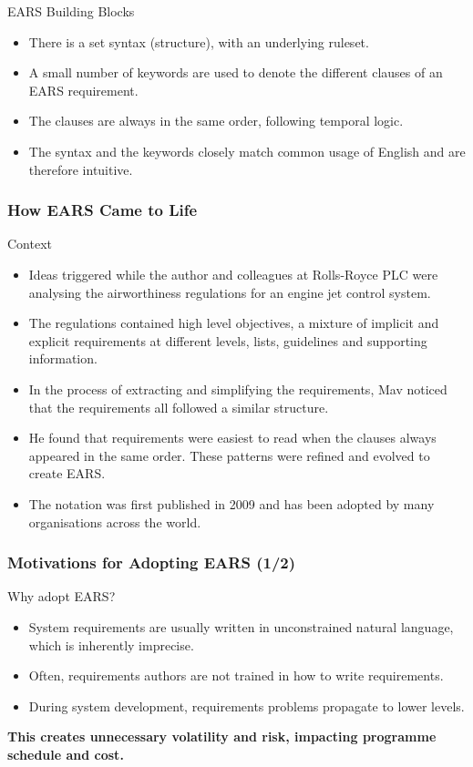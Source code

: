 \documentclass[aspectratio=169]{beamer}
\begin{document}
\begin{frame}

\begin{block}{EARS Building Blocks}
  \begin{itemize}
    \item There is a set syntax (structure), with an underlying ruleset. 
    \item A small number of keywords are used to denote the different clauses of an EARS requirement. 
    \item The clauses are always in the same order, following temporal logic. 
    \item The syntax and the keywords closely match common usage of English and are therefore intuitive.
  \end{itemize}  
\end{block}

\end{frame}


\begin{frame}
  \small
  \frametitle{How EARS Came to Life}
  \begin{block}{Context}
  \begin{itemize}
    \item Ideas triggered while the author and colleagues at Rolls-Royce PLC were analysing the airworthiness regulations for an engine jet control system. 
    \item The regulations contained high level objectives, a mixture of implicit and explicit requirements at different levels, lists, guidelines and supporting information.
    \item In the process of extracting and simplifying the requirements, Mav noticed that the requirements all followed a similar structure.
    \item He found that requirements were easiest to read when the clauses always appeared in the same order. These patterns were refined and evolved to create EARS.
    \item The notation was first published in 2009 and has been adopted by many organisations across the world.
  \end{itemize}
  \end{block}
  
\end{frame}

\begin{frame}
  \frametitle{Motivations for Adopting EARS (1/2)}
  \begin{block}{Why adopt EARS?}
  \begin{itemize}
  \item  System requirements are usually written in unconstrained natural language, which is inherently imprecise. 
  \item Often, requirements authors are not trained in how to write requirements. 
  \item During system development, requirements problems propagate to lower levels. 
  \end{itemize}
  {\bf This creates unnecessary volatility and risk, impacting programme schedule and cost.}
  \end{block} 
\end{frame}
\end{document}
